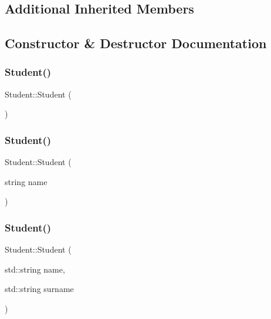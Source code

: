 \subsection*{Additional Inherited Members}


\subsection{Constructor \& Destructor Documentation}
\mbox{\label{class_student_af9168cedbfa5565cf0b20c1a9d3f5c9d}} 
\subsubsection{\texorpdfstring{Student()}{Student()}\hspace{0.1cm}{\footnotesize\ttfamily [1/3]}}
{\footnotesize\ttfamily Student\+::\+Student (\begin{DoxyParamCaption}{ }\end{DoxyParamCaption})\hspace{0.3cm}{\ttfamily [inline]}}

\mbox{\label{class_student_aa8659e569d5a87efe8553b439142ad4d}} 
\subsubsection{\texorpdfstring{Student()}{Student()}\hspace{0.1cm}{\footnotesize\ttfamily [2/3]}}
{\footnotesize\ttfamily Student\+::\+Student (\begin{DoxyParamCaption}\item[{string}]{name }\end{DoxyParamCaption})\hspace{0.3cm}{\ttfamily [inline]}}

\mbox{\label{class_student_ab2d9c6e05ea5a505708a3d82ece8a5ae}} 
\subsubsection{\texorpdfstring{Student()}{Student()}\hspace{0.1cm}{\footnotesize\ttfamily [3/3]}}
{\footnotesize\ttfamily Student\+::\+Student (\begin{DoxyParamCaption}\item[{std\+::string}]{name,  }\item[{std\+::string}]{surname }\end{DoxyParamCaption})\hspace{0.3cm}{\ttfamily [inline]}}

